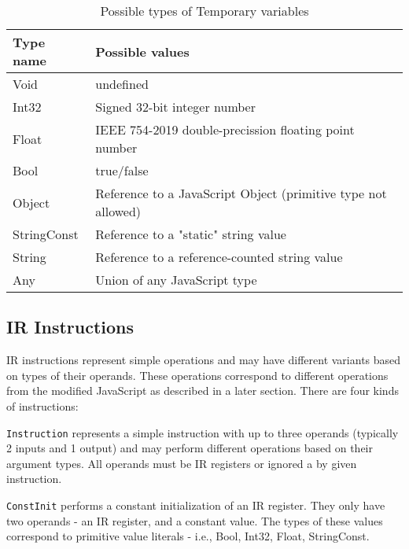 \begin{table}
    \centering
    \begin{tabular}{l | l}
        Type name   & Possible values                                                \\\hline
        Void        & undefined                                                      \\
        Int32       & Signed 32-bit integer number                                   \\
        Float       & IEEE 754-2019 double-precission floating point number          \\
        Bool        & true/false                                                     \\
        Object      & Reference to a JavaScript Object (primitive type not allowed)  \\
        StringConst & Reference to a "static" string value                           \\
        String      & Reference to a reference-counted string value                  \\
        Any         & Union of any JavaScript type
    \end{tabular}
    \caption{Possible types of Temporary variables}
    \label{tab:types}
\end{table}


\subsection{IR Instructions}

IR instructions represent simple operations and may have different variants based on types of their operands. These operations correspond to different operations from the modified JavaScript as described in a later section. There are four kinds of instructions:


\texttt{Instruction} represents a simple instruction with up to three operands (typically 2 inputs and 1 output) and may perform different operations based on their argument types. All operands must be IR registers or ignored a by given instruction.

\texttt{ConstInit} performs a constant initialization of an IR register. They only have two operands - an IR register, and a constant value. The types of these values correspond to primitive value literals - i.e., Bool, Int32, Float, StringConst.

